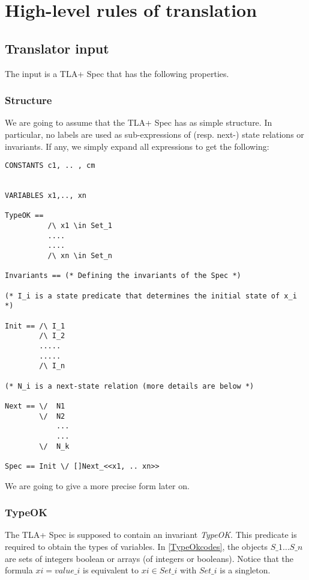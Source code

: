\documentclass{article}
\theoremstyle{plain}
\numberwithin{equation}{section}
\begin{document}
\section{High-level rules of translation }
  




\subsection{Translator input}
The input is a TLA+ Spec that has the following properties. 

\subsubsection{Structure} \label{Structure}
We are going to assume that the TLA+ Spec has as simple structure. In particular,
 no labels are used as sub-expressions of (resp. next-) state relations or invariants. If any,
 we simply expand all expressions to get the following: 


\begin{lstlisting}[frame=single]
CONSTANTS c1, .. , cm


VARIABLES x1,.., xn

TypeOK == 
          /\ x1 \in Set_1
          ....
          ....
          /\ xn \in Set_n

Invariants == (* Defining the invariants of the Spec *)           

(* I_i is a state predicate that determines the initial state of x_i *)

Init == /\ I_1    
        /\ I_2 
        .....
        .....
        /\ I_n 

(* N_i is a next-state relation (more details are below *)

Next == \/  N1 
        \/  N2 
            ...
            ...
        \/  N_k 

Spec == Init \/ []Next_<<x1, .. xn>>        
\end{lstlisting}

We are going to  give a more precise form later on.
\subsubsection{TypeOK} \label{TypeOK} The TLA+ Spec is supposed to contain an invariant \emph{TypeOK}.  This predicate is required to obtain the types of variables. In \eqref{TypeOkcodes}, the objects $S\_1 \dots S\_n$ are sets of integers boolean or arrays (of integers or booleans). Notice that the formula $xi=value\_i$ is equivalent to $xi \in Set\_i$ with $Set\_i$ is a singleton. 
\end{document}
